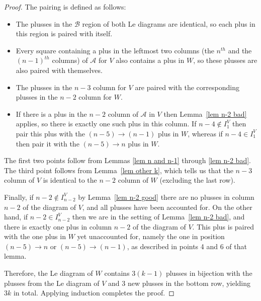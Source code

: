 \documentclass[11pt]{article}
\theoremstyle{remark}
\theoremstyle{definition}
\begin{document}
\begin{proof}
 The pairing is defined as follows:
  \begin{itemize}
  \item The plusses in the $\mathcal{B}$ region of both Le diagrams are identical, so each plus in this region is paired with itself.
  \item Every square containing a plus in the leftmost two columns (the $n^{th}$ and the $(n-1)^{th}$ columns)  of $\mathcal{A}$ for $V$ also contains a plus in $W$, so these plusses are also paired with themselves.
  \item The plusses in the $n-3$ column for $V$ are paired with the corresponding plusses in the $n-2$ column for $W$.
  \item If there is a plus in the $n-2$ column of $\mathcal{A}$ in $V$ then Lemma~\ref{lem n-2 bad} applies, so there is exactly one such plus in this column. If $n-4 \not\in I_1^V$ then pair this plus with the $(n-5)\rightarrow (n-1)$ plus in $W$, whereas if $n-4 \in I_1^V$ then pair it with the $(n-5) \rightarrow n$ plus in $W$.

  \end{itemize}
The first two points follow from Lemmas \ref{lem n and n-1} through \ref{lem n-2 bad}. The third point follows from Lemma~\ref{lem other k}, which tells us that the $n-3$ column of $V$ is identical to the $n-2$ column of $W$ (excluding the last row).

Finally, if $n-2 \not\in I_{n-2}^V$ by Lemma~\ref{lem n-2 good} there are no plusses in column $n-2$ of the diagram of $V$, and all plusses have been accounted for. On the other hand, if $n-2 \in I_{n-2}^V$ then we are in the setting of Lemma~\ref{lem n-2 bad}, and there is exactly one plus in column $n-2$ of the diagram of $V$. This plus is paired with the one plus in $W$ yet unaccounted for, namely the one in position $(n-5) \rightarrow n$ or $(n-5) \rightarrow (n-1)$, as described in points 4 and 6 of that lemma.

Therefore, the Le diagram of $W$ contains $3(k-1)$ plusses in bijection with the plusses from the Le diagram of $V$ and 3 new plusses in the bottom row, yielding $3k$ in total. Applying induction completes the proof.
\end{proof}
\end{document}
